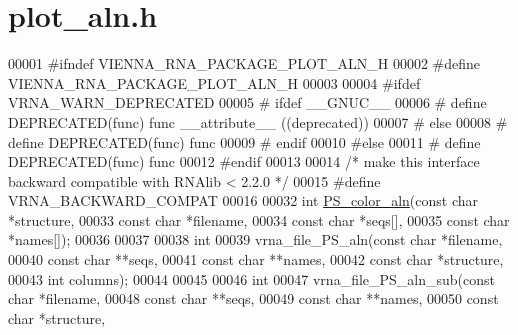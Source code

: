 \hypertarget{plot__aln_8h_source}{}\section{plot\+\_\+aln.\+h}
\label{plot__aln_8h_source}

\begin{DoxyCode}
00001 \textcolor{preprocessor}{#ifndef VIENNA\_RNA\_PACKAGE\_PLOT\_ALN\_H}
00002 \textcolor{preprocessor}{#define VIENNA\_RNA\_PACKAGE\_PLOT\_ALN\_H}
00003 
00004 \textcolor{preprocessor}{#ifdef VRNA\_WARN\_DEPRECATED}
00005 \textcolor{preprocessor}{# ifdef \_\_GNUC\_\_}
00006 \textcolor{preprocessor}{#  define DEPRECATED(func) func \_\_attribute\_\_ ((deprecated))}
00007 \textcolor{preprocessor}{# else}
00008 \textcolor{preprocessor}{#  define DEPRECATED(func) func}
00009 \textcolor{preprocessor}{# endif}
00010 \textcolor{preprocessor}{#else}
00011 \textcolor{preprocessor}{# define DEPRECATED(func) func}
00012 \textcolor{preprocessor}{#endif}
00013 
00014 \textcolor{comment}{/* make this interface backward compatible with RNAlib < 2.2.0 */}
00015 \textcolor{preprocessor}{#define VRNA\_BACKWARD\_COMPAT}
00016 
00032 \textcolor{keywordtype}{int} \hyperlink{group__plotting__utils_ga821802c3685e37e15182341f6217470d}{PS\_color\_aln}(\textcolor{keyword}{const} \textcolor{keywordtype}{char} *structure,
00033                  \textcolor{keyword}{const} \textcolor{keywordtype}{char} *filename,
00034                  \textcolor{keyword}{const} \textcolor{keywordtype}{char} *seqs[],
00035                  \textcolor{keyword}{const} \textcolor{keywordtype}{char} *names[]);
00036 
00037 
00038 \textcolor{keywordtype}{int}
00039 vrna\_file\_PS\_aln(\textcolor{keyword}{const} \textcolor{keywordtype}{char} *filename,
00040                  \textcolor{keyword}{const} \textcolor{keywordtype}{char} **seqs,
00041                  \textcolor{keyword}{const} \textcolor{keywordtype}{char} **names,
00042                  \textcolor{keyword}{const} \textcolor{keywordtype}{char} *structure,
00043                  \textcolor{keywordtype}{int}        columns);
00044 
00045 
00046 \textcolor{keywordtype}{int}
00047 vrna\_file\_PS\_aln\_sub(\textcolor{keyword}{const} \textcolor{keywordtype}{char} *filename,
00048                      \textcolor{keyword}{const} \textcolor{keywordtype}{char} **seqs,
00049                      \textcolor{keyword}{const} \textcolor{keywordtype}{char} **names,
00050                      \textcolor{keyword}{const} \textcolor{keywordtype}{char} *structure,

\end{DoxyCode}
